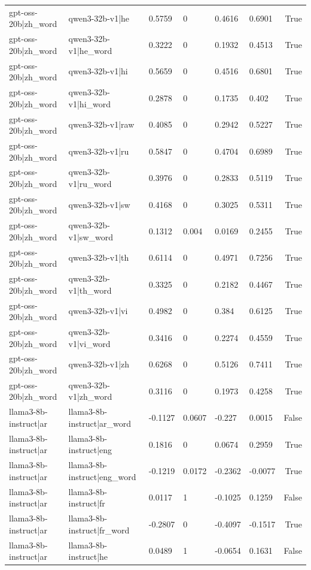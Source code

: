 \begin{table}
\begin{tabular}{llllllr}
gpt-oss-20b|zh_word & qwen3-32b-v1|he & 0.5759 & 0 & 0.4616 & 0.6901 & True \\
gpt-oss-20b|zh_word & qwen3-32b-v1|he_word & 0.3222 & 0 & 0.1932 & 0.4513 & True \\
gpt-oss-20b|zh_word & qwen3-32b-v1|hi & 0.5659 & 0 & 0.4516 & 0.6801 & True \\
gpt-oss-20b|zh_word & qwen3-32b-v1|hi_word & 0.2878 & 0 & 0.1735 & 0.402 & True \\
gpt-oss-20b|zh_word & qwen3-32b-v1|raw & 0.4085 & 0 & 0.2942 & 0.5227 & True \\
gpt-oss-20b|zh_word & qwen3-32b-v1|ru & 0.5847 & 0 & 0.4704 & 0.6989 & True \\
gpt-oss-20b|zh_word & qwen3-32b-v1|ru_word & 0.3976 & 0 & 0.2833 & 0.5119 & True \\
gpt-oss-20b|zh_word & qwen3-32b-v1|sw & 0.4168 & 0 & 0.3025 & 0.5311 & True \\
gpt-oss-20b|zh_word & qwen3-32b-v1|sw_word & 0.1312 & 0.004 & 0.0169 & 0.2455 & True \\
gpt-oss-20b|zh_word & qwen3-32b-v1|th & 0.6114 & 0 & 0.4971 & 0.7256 & True \\
gpt-oss-20b|zh_word & qwen3-32b-v1|th_word & 0.3325 & 0 & 0.2182 & 0.4467 & True \\
gpt-oss-20b|zh_word & qwen3-32b-v1|vi & 0.4982 & 0 & 0.384 & 0.6125 & True \\
gpt-oss-20b|zh_word & qwen3-32b-v1|vi_word & 0.3416 & 0 & 0.2274 & 0.4559 & True \\
gpt-oss-20b|zh_word & qwen3-32b-v1|zh & 0.6268 & 0 & 0.5126 & 0.7411 & True \\
gpt-oss-20b|zh_word & qwen3-32b-v1|zh_word & 0.3116 & 0 & 0.1973 & 0.4258 & True \\
llama3-8b-instruct|ar & llama3-8b-instruct|ar_word & -0.1127 & 0.0607 & -0.227 & 0.0015 & False \\
llama3-8b-instruct|ar & llama3-8b-instruct|eng & 0.1816 & 0 & 0.0674 & 0.2959 & True \\
llama3-8b-instruct|ar & llama3-8b-instruct|eng_word & -0.1219 & 0.0172 & -0.2362 & -0.0077 & True \\
llama3-8b-instruct|ar & llama3-8b-instruct|fr & 0.0117 & 1 & -0.1025 & 0.1259 & False \\
llama3-8b-instruct|ar & llama3-8b-instruct|fr_word & -0.2807 & 0 & -0.4097 & -0.1517 & True \\
llama3-8b-instruct|ar & llama3-8b-instruct|he & 0.0489 & 1 & -0.0654 & 0.1631 & False \\

\end{tabular}
\end{table}
